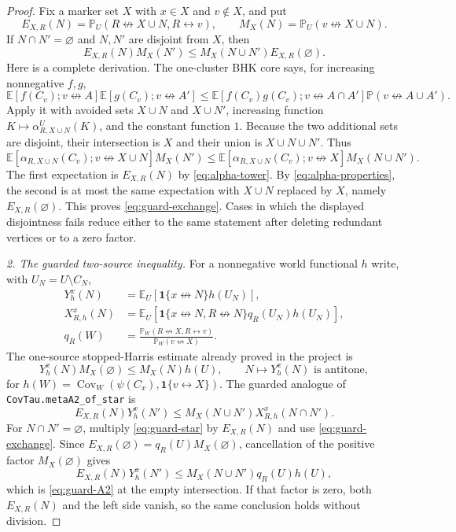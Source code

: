 \documentclass[11pt]{article}
\theoremstyle{definition}
\theoremstyle{remark}
\newcommand{\PP}{\mathbb P}
\newcommand{\EE}{\mathbb E}
\newcommand{\one}{\mathbf 1}
\newcommand{\con}{\leftrightarrow}
\newcommand{\ncon}{\not\leftrightarrow}
\newcommand{\lean}[1]{\texttt{#1}}
\begin{document}
\begin{proof}
Fix a marker set $X$ with $x\in X$ and $v\notin X$, and put
\[
 E_{X,R}(N)=\PP_U(R\ncon X\cup N,R\con v),\qquad
 M_X(N)=\PP_U(v\ncon X\cup N).
\]
If $N\cap N'=\varnothing$ and $N,N'$ are disjoint from $X$, then
\begin{equation}\label{eq:guard-exchange}
 E_{X,R}(N)M_X(N')
 \leq M_X(N\cup N')E_{X,R}(\varnothing).
\end{equation}
Here is a complete derivation.  The one-cluster BHK core says, for
increasing nonnegative $f,g$,
\[
 \EE[f(C_v);v\ncon A]\EE[g(C_v);v\ncon A']
 \leq \EE[f(C_v)g(C_v);v\ncon A\cap A']
       \PP(v\ncon A\cup A').
\]
Apply it with avoided sets $X\cup N$ and $X\cup N'$, increasing function
$K\mapsto\alpha_{R,X\cup N}^{U}(K)$, and the constant function $1$.
Because the two additional sets are disjoint, their intersection is
$X$ and their union is $X\cup N\cup N'$.  Thus
\[
 \EE[\alpha_{R,X\cup N}(C_v);v\ncon X\cup N]M_X(N')
 \leq
 \EE[\alpha_{R,X\cup N}(C_v);v\ncon X]M_X(N\cup N').
\]
The first expectation is $E_{X,R}(N)$ by
\eqref{eq:alpha-tower}.  By \eqref{eq:alpha-properties}, the second is at
most the same expectation with $X\cup N$ replaced by $X$, namely
$E_{X,R}(\varnothing)$.  This proves \eqref{eq:guard-exchange}.  Cases in
which the displayed disjointness fails reduce either to the same statement
after deleting redundant vertices or to a zero factor.

\emph{2. The guarded two-source inequality.}
For a nonnegative world functional $h$ write, with
$U_N=U\setminus C_N$,
\begin{align*}
 Y_h^x(N)&=\EE_U[\one\{x\ncon N\}h(U_N)],\\
 X_{R,h}^x(N)&=\EE_U[\one\{x\ncon N,R\ncon N\}
                 q_R(U_N)h(U_N)],\\
 q_R(W)&=\frac{\PP_W(R\ncon X,R\con v)}
                    {\PP_W(v\ncon X)}.
\end{align*}
The one-source stopped-Harris estimate already proved in the project is
\begin{equation}\label{eq:guard-star}
 Y_h^x(N)M_X(\varnothing)\leq M_X(N)h(U),
 \qquad N\longmapsto Y_h^x(N)\text{ is antitone},
\end{equation}
for
$h(W)=\operatorname{Cov}_W(\psi(C_x),\one\{v\con X\})$.
The guarded analogue of \lean{CovTau.metaA2\_of\_star} is
\begin{equation}\label{eq:guard-A2}
 E_{X,R}(N)Y_h^x(N')
 \leq M_X(N\cup N')X_{R,h}^x(N\cap N').
\end{equation}
For $N\cap N'=\varnothing$, multiply \eqref{eq:guard-star} by
$E_{X,R}(N)$ and use \eqref{eq:guard-exchange}.  Since
$E_{X,R}(\varnothing)=q_R(U)M_X(\varnothing)$, cancellation of the
positive factor $M_X(\varnothing)$ gives
\[
 E_{X,R}(N)Y_h^x(N')
 \leq M_X(N\cup N')q_R(U)h(U),
\]
which is \eqref{eq:guard-A2} at the empty intersection.  If that factor
is zero, both $E_{X,R}(N)$ and the left side vanish, so the same conclusion
holds without division.


\end{proof}
\end{document}

